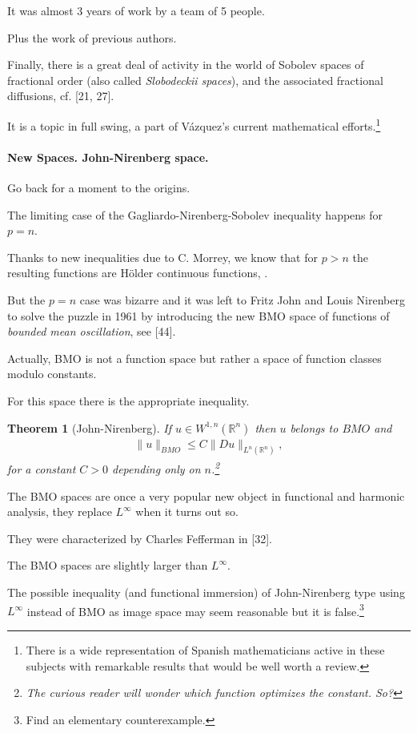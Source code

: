 \documentclass{article}
\newtheorem{theorem}{Theorem}
\begin{document}
It was almost 3 years of work by a team of 5 people.

Plus the work of previous authors.

%
Finally, there is a great deal of activity in the world of Sobolev spaces of fractional order (also called \textit{Slobodeckii spaces}), and the associated fractional diffusions, cf. [21, 27].

It is a topic in full swing, a part of V\'azquez's current mathematical efforts.\footnote{There is a wide representation of Spanish mathematicians active in these subjects with remarkable results that would be well worth a review.}

\paragraph{New Spaces. John-Nirenberg space.} Go back for a moment to the origins.

The limiting case of the Gagliardo-Nirenberg-Sobolev inequality happens for $p = n$.

Thanks to new inequalities due to C. Morrey, we know that for $p > n$ the resulting functions are H\"older continuous functions, \cite{Evans2010}.

But the $p = n$ case was bizarre and it was left to Fritz John and Louis Nirenberg to solve the puzzle in 1961 by introducing the new BMO space of functions of \textit{bounded mean oscillation}, see [44].

Actually, BMO is not a function space but rather a space of function classes modulo constants.

For this space there is the appropriate inequality.

\begin{theorem}[John-Nirenberg]
	If $u\in W^{1,n}(\mathbb{R}^n)$ then $u$ belongs to $BMO$ and
	\begin{align*}
		\|u\|_{BMO}\le C\|Du\|_{L^n(\mathbb{R}^n)},
	\end{align*}
	for a constant $C > 0$ depending only on $n$.\footnote{The curious reader will wonder which function optimizes the constant. So?}
\end{theorem}
The BMO spaces are once a very popular new object in functional and harmonic analysis, they replace $L^\infty$ when it turns out so.

They were characterized by Charles Fefferman in [32].

The BMO spaces are slightly larger than $L^\infty$.

The possible inequality (and functional immersion) of John-Nirenberg type using $L^\infty$ instead of BMO as image space may seem reasonable but it is false.\footnote{Find an elementary counterexample.}
\end{document}
